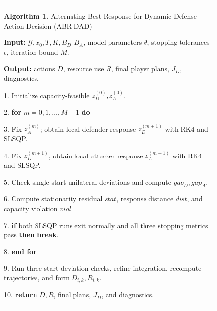 \documentclass[conference,letterpaper]{IEEEtran}
\begin{document}
\begin{figure}[t]
\centering
\begin{minipage}{\columnwidth}
\hrule\vspace{2pt}
{\footnotesize\textbf{Algorithm 1.} Alternating Best Response for Dynamic Defense Action Decision (ABR-DAD)}\par\vspace{2pt}
{\scriptsize
\textbf{Input:} $\mathcal G,x_0,T,K,B_D,B_A$, model parameters $\theta$, stopping tolerances $\epsilon$, iteration bound $M$.\par
\textbf{Output:} actions $D$, resource use $R$, final player plans, $J_D$, diagnostics.\par
1. Initialize capacity-feasible $z_D^{(0)},z_A^{(0)}$.\par
2. \textbf{for} $m=0,1,\ldots,M-1$ \textbf{do}\par
3. \quad Fix $z_A^{(m)}$; obtain local defender response $z_D^{(m+1)}$ with RK4 and SLSQP.\par
4. \quad Fix $z_D^{(m+1)}$; obtain local attacker response $z_A^{(m+1)}$ with RK4 and SLSQP.\par
5. \quad Check single-start unilateral deviations and compute $gap_D,gap_A$.\par
6. \quad Compute stationarity residual $stat$, response distance $dist$, and capacity violation $viol$.\par
7. \quad \textbf{if} both SLSQP runs exit normally and all three stopping metrics pass \textbf{then break}.\par
8. \textbf{end for}\par
9. Run three-start deviation checks, refine integration, recompute trajectories, and form $D_{i,k},R_{i,k}$.\par
10. \textbf{return} $D,R$, final plans, $J_D$, and diagnostics.
}\vspace{3pt}\hrule
\end{minipage}
\end{figure}
\end{document}
